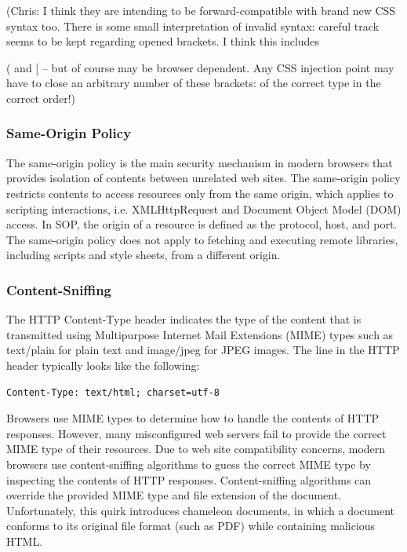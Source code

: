 \documentclass{acm_proc_article-sp}
\begin{document}
(Chris: I think they are intending to be forward-compatible with brand new CSS syntax too.
There is some small interpretation of invalid syntax: careful track seems to be kept regarding opened brackets. I think this includes { ( and [ -- but of course may be browser dependent. Any CSS injection point may have to close an arbitrary number of these brackets: of the correct type in the correct order!)

\subsubsection{Same-Origin Policy}
The same-origin policy\cite{mozillasameorigin} is the main security mechanism in modern browsers that provides isolation of contents between unrelated web sites. The same-origin policy restricts contents to access resources only from the same origin, which applies to scripting interactions, i.e. XMLHttpRequest and Document Object Model (DOM)\cite{dom} access. In SOP, the origin of a resource is defined as the protocol, host, and port. The same-origin policy does not apply to fetching and executing remote libraries, including scripts and style sheets, from a different origin.

\subsubsection{Content-Sniffing}
The HTTP Content-Type header indicates the type of the content that is transmitted using Multipurpose Internet Mail Extensions (MIME)\cite{mime} types such as text/plain for plain text and image/jpeg for JPEG images. The line in the HTTP header typically looks like the following:
\begin{verbatim}
Content-Type: text/html; charset=utf-8
\end{verbatim}
Browsers use MIME types to determine how to handle the contents of HTTP responses. However, many misconfigured web servers fail to provide the correct MIME type of their resources. Due to web site compatibility concerns, modern browsers use content-sniffing algorithms\cite{securecontentsniffing} to guess the correct MIME type by inspecting the contents of HTTP responses.  Content-sniffing algorithms can override the provided MIME type and file extension of the document. Unfortunately, this quirk introduces chameleon documents, in which a document conforms to its original file format (such as PDF) while containing malicious HTML.

}
\end{document}
